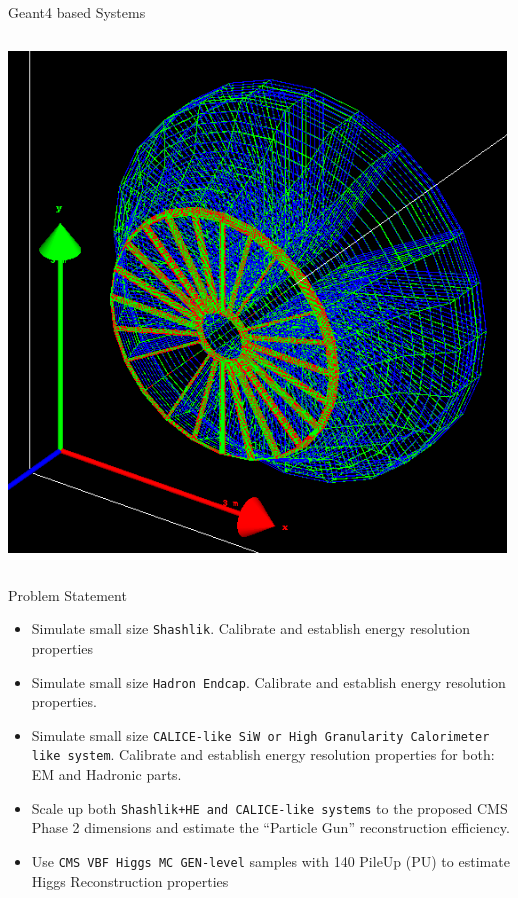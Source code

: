 \documentclass[pdf, 9pt]{beamer}
\begin{document}
\begin{frame}{Geant4 based Systems}
\begin{columns}[T]
\begin{column}{0.3\textwidth}
\begin{flushright}
          \includegraphics[width=0.99\textwidth, height=0.4\textheight]{figs/shashlik_fullscale/Shashlik+HE_Complete_Wire.png}
        \end{flushright}
      \end{column}
    \end{columns}
  \end{frame}


  \begin{frame}{Problem Statement}
    \begin{itemize}
      \item Simulate small size \texttt{Shashlik}. Calibrate and establish energy resolution properties
      \item Simulate small size \texttt{Hadron Endcap}. Calibrate and establish energy resolution properties.
      \item Simulate small size \texttt{CALICE-like SiW or High Granularity Calorimeter like system}. Calibrate and establish energy resolution properties for both: EM and Hadronic parts.
      \item Scale up both \texttt{Shashlik+HE and CALICE-like systems} to the proposed CMS Phase 2 dimensions and estimate the ``Particle Gun'' reconstruction efficiency.
      \item \pause Use \texttt{CMS VBF Higgs MC GEN-level} samples with 140 PileUp (PU) to estimate Higgs Reconstruction properties
    \end{itemize}
  \end{frame}
\end{document}
